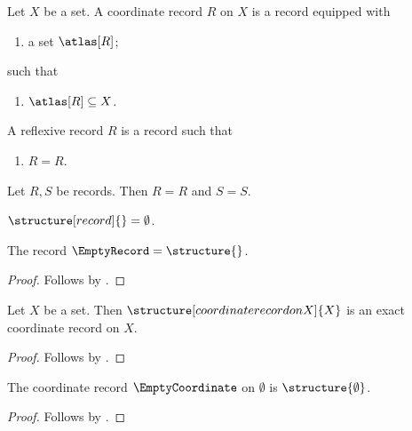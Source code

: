 

\begin{struct}\label{coordinate_record}
    Let $X$ be a set.
    A coordinate record $R$ on $X$ is a record equipped with
    \begin{enumerate}
        \item a set $\atlas[R]$;
    \end{enumerate}
    such that
    \begin{enumerate}
        \item\label{coordinate_atlas_bound} $\atlas[R]\subseteq X$.
    \end{enumerate}
\end{struct}

\begin{struct}\label{reflexive_record}
    A reflexive record $R$ is a record such that
    \begin{enumerate}
        \item\label{reflexive_record_law} $R=R$.
    \end{enumerate}
\end{struct}

\begin{proposition}\label{record_plural}
    Let $R,S$ be records.
    Then $R=R$ and $S=S$.
\end{proposition}

\begin{proposition}\label{empty_record_term}
    $\structure[record]{}=\emptyset$.
\end{proposition}

\begin{instance}\label{empty_record}
    The record $\EmptyRecord=\structure{}$.
\end{instance}
\begin{proof}
    Follows by .
\end{proof}

\begin{proposition}\label{coordinate_aggregate}
    Let $X$ be a set.
    Then $\structure[coordinate record on X]{X}$ is an exact coordinate record on $X$.
\end{proposition}
\begin{proof}
    Follows by .
\end{proof}

\begin{instance}\label{empty_coordinate_record}
    The coordinate record $\EmptyCoordinate$ on $\emptyset$ is $\structure{\emptyset}$.
\end{instance}
\begin{proof}
    Follows by .
\end{proof}


